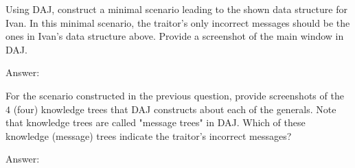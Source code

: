 \documentclass{article}
\begin{document}
\begin{Question} 
\begin{Subquestion}
    Using DAJ, construct a minimal scenario leading to the shown data structure for Ivan. In this minimal scenario, the traitor's only incorrect messages should be the ones in Ivan's data structure above. Provide a screenshot of the main window in DAJ.
    
\begin{answer}
    Answer:
    \begin{quote}
        
    \end{quote}
\end{answer}
\end{Subquestion}

\begin{Subquestion}
    For the scenario constructed in the previous question, provide screenshots of the $4$ (four) knowledge trees that DAJ constructs about each of the generals. Note that knowledge trees are called "message trees" in DAJ. Which of these knowledge (message) trees indicate the traitor's incorrect messages?
    
\begin{answer}
    Answer:
    \begin{quote}
        
    \end{quote}
\end{answer}
\end{Subquestion}
\end{Question}


\clearpage
\setcounter{question}{1}
\end{document}
